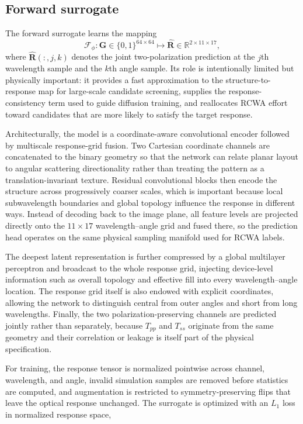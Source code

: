 \subsection{Forward surrogate}

The forward surrogate learns the mapping
\begin{equation}
\mathcal{F}_{\phi}: \mathbf{G}\in\{0,1\}^{64\times64}\mapsto \widehat{\mathbf{R}}\in\mathbb{R}^{2\times11\times17},
\end{equation}
where $\widehat{\mathbf{R}}(:,j,k)$ denotes the joint two-polarization prediction at the $j$th wavelength sample and the $k$th angle sample. Its role is intentionally limited but physically important: it provides a fast approximation to the structure-to-response map for large-scale candidate screening, supplies the response-consistency term used to guide diffusion training, and reallocates RCWA effort toward candidates that are more likely to satisfy the target response.

Architecturally, the model is a coordinate-aware convolutional encoder followed by multiscale response-grid fusion. Two Cartesian coordinate channels are concatenated to the binary geometry so that the network can relate planar layout to angular scattering directionality rather than treating the pattern as a translation-invariant texture. Residual convolutional blocks then encode the structure across progressively coarser scales, which is important because local subwavelength boundaries and global topology influence the response in different ways. Instead of decoding back to the image plane, all feature levels are projected directly onto the $11\times17$ wavelength--angle grid and fused there, so the prediction head operates on the same physical sampling manifold used for RCWA labels.

The deepest latent representation is further compressed by a global multilayer perceptron and broadcast to the whole response grid, injecting device-level information such as overall topology and effective fill into every wavelength--angle location. The response grid itself is also endowed with explicit coordinates, allowing the network to distinguish central from outer angles and short from long wavelengths. Finally, the two polarization-preserving channels are predicted jointly rather than separately, because $T_{pp}$ and $T_{ss}$ originate from the same geometry and their correlation or leakage is itself part of the physical specification.

For training, the response tensor is normalized pointwise across channel, wavelength, and angle, invalid simulation samples are removed before statistics are computed, and augmentation is restricted to symmetry-preserving flips that leave the optical response unchanged. The surrogate is optimized with an $L_1$ loss in normalized response space,

